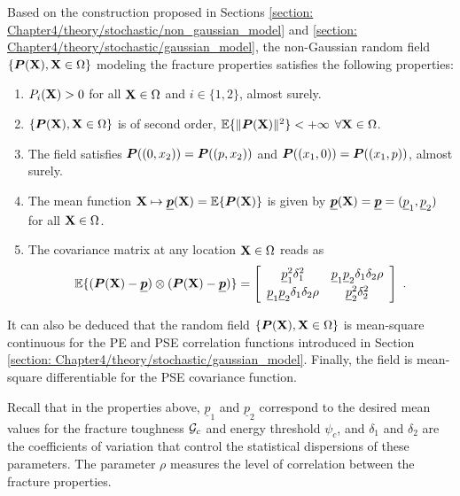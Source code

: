 Based on the construction proposed in Sections \ref{section: Chapter4/theory/stochastic/non_gaussian_model} and \ref{section: Chapter4/theory/stochastic/gaussian_model}, the non-Gaussian random field $\{\boldsymbol{P}(\textbf{X}), \textbf{X} \in \Omega\}$ modeling the fracture properties satisfies the following properties:
\begin{enumerate}
  \item $P_i(\textbf{X}) > 0$ for all $\textbf{X} \in \Omega$ and $i \in \{1,2\}$, almost surely.
  \item $\{\boldsymbol{P}(\textbf{X}), \textbf{X} \in \Omega\}$ is of second order, $\mathbb{E}\{\|\boldsymbol{P}(\textbf{X})\|^2\} < + \infty$ $\forall \textbf{X} \in \Omega$.
  \item The field satisfies $\boldsymbol{P}((0, x_2)) = \boldsymbol{P}((p, x_2))$ and $\boldsymbol{P}((x_1, 0)) = \boldsymbol{P}((x_1, p))$, almost surely.
  \item The mean function $\textbf{X} \mapsto \underline{\boldsymbol{p}}(\textbf{X}) = \mathbb{E}\{\boldsymbol{P}(\textbf{X})\}$ is given by $\underline{\boldsymbol{p}}(\textbf{X}) = \underline{\boldsymbol{p}} = (\underline{p}_1, \underline{p}_2)$ for all $\textbf{X} \in \Omega$.
  \item The covariance matrix at any location $\textbf{X} \in \Omega$ reads as
        \begin{align}
          \mathbb{E}\{(\boldsymbol{P}(\textbf{X}) - \underline{\boldsymbol{p}}) \otimes (\boldsymbol{P}(\textbf{X}) - \underline{\boldsymbol{p}})\} = \left[\begin{array}{cc} \underline{p}_1^2 \delta_1^2 &  \underline{p}_1 \underline{p}_2 \delta_1  \delta_2 \rho  \\[1mm] \underline{p}_1 \underline{p}_2 \delta_1  \delta_2 \rho & \underline{p}_2^2 \delta_2^2 \end{array}\right]~.
        \end{align}
\end{enumerate}
It can also be deduced that the random field $\{\boldsymbol{P}(\textbf{X}), \textbf{X} \in \Omega\}$ is mean-square continuous for the PE and PSE correlation functions introduced in Section \ref{section: Chapter4/theory/stochastic/gaussian_model}. Finally, the field is mean-square differentiable for the PSE covariance function.

Recall that in the properties above, $\underline{p}_1$ and $\underline{p}_2$ correspond to the desired mean values for the fracture toughness ${\mathcal{G}_c}$ and energy threshold $\psi_c$, and $\delta_1$ and $\delta_2$ are the coefficients of variation that control the statistical dispersions of these parameters. The parameter $\rho$ measures the level of correlation between the fracture properties.

